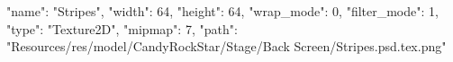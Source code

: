 {
  "name": "Stripes",
  "width": 64,
  "height": 64,
  "wrap_mode": 0,
  "filter_mode": 1,
  "type": "Texture2D",
  "mipmap": 7,
  "path": "Resources/res/model/CandyRockStar/Stage/Back Screen/Stripes.psd.tex.png"
}